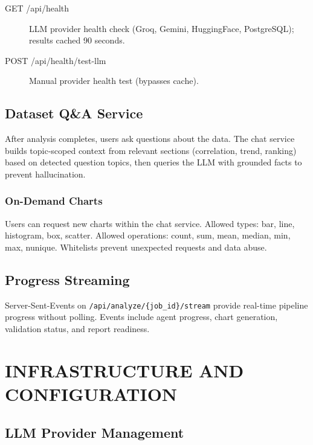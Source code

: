 \begin{description}
	\item[GET /api/health] LLM provider health check (Groq, Gemini, HuggingFace, PostgreSQL); results cached 90 seconds.
	\item[POST /api/health/test-llm] Manual provider health test (bypasses cache).
\end{description}

\section{Dataset Q\&A Service}

After analysis completes, users ask questions about the data. The chat service builds topic-scoped context from relevant sections (correlation, trend, ranking) based on detected question topics, then queries the LLM with grounded facts to prevent hallucination.

\subsection{On-Demand Charts}

Users can request new charts within the chat service. Allowed types: bar, line, histogram, box, scatter. Allowed operations: count, sum, mean, median, min, max, nunique. Whitelists prevent unexpected requests and data abuse.

\section{Progress Streaming}

Server-Sent-Events on \texttt{/api/analyze/\{job\_id\}/stream} provide real-time pipeline progress without polling. Events include agent progress, chart generation, validation status, and report readiness.

\chapter{INFRASTRUCTURE AND CONFIGURATION}
\label{ch:infrastructure}

\section{LLM Provider Management}

